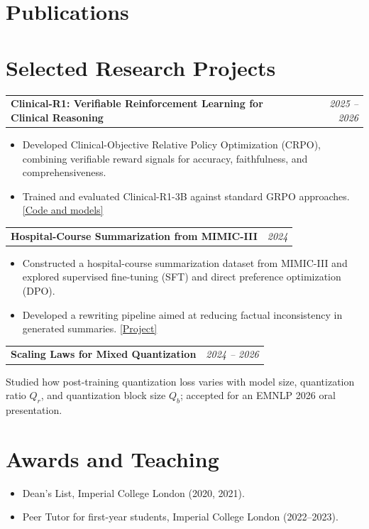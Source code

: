 \documentclass[a4paper,10pt]{article}
\makeatletter
\newcommand{\cventry}[3]{%
  \noindent\begin{tabular*}{\linewidth}{@{}l@{\extracolsep{\fill}}r@{}}
    \textbf{#1} & \textit{#2}\\
  \end{tabular*}\par\vspace{-3pt}%
  #3\par\vspace{2pt}%
}
\makeatother
\begin{document}
\section{Publications}


\section{Selected Research Projects}
\cventry{Clinical-R1: Verifiable Reinforcement Learning for Clinical Reasoning}{2025 -- 2026}{%
  \begin{itemize}
    \item Developed Clinical-Objective Relative Policy Optimization (CRPO), combining verifiable reward signals for accuracy, faithfulness, and comprehensiveness.
    \item Trained and evaluated Clinical-R1-3B against standard GRPO approaches. \href{https://github.com/BoyangGu1/Clinical-R1-3B}{[Code and models]}
  \end{itemize}
}
\cventry{Hospital-Course Summarization from MIMIC-III}{2024}{%
  \begin{itemize}
    \item Constructed a hospital-course summarization dataset from MIMIC-III and explored supervised fine-tuning (SFT) and direct preference optimization (DPO).
    \item Developed a rewriting pipeline aimed at reducing factual inconsistency in generated summaries. \href{https://github.com/BoyangGu1/MIMIC-Admission-Summary}{[Project]}
  \end{itemize}
}
\cventry{Scaling Laws for Mixed Quantization}{2024 -- 2026}{%
  Studied how post-training quantization loss varies with model size, quantization ratio $Q_r$, and quantization block size $Q_b$; accepted for an EMNLP 2026 oral presentation.}

\section{Awards and Teaching}
\begin{itemize}
  \item Dean's List, Imperial College London (2020, 2021).
  \item Peer Tutor for first-year students, Imperial College London (2022--2023).
\end{itemize}
\end{document}
